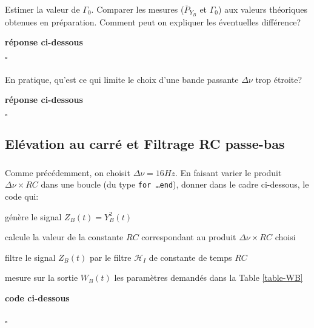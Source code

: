 \documentclass{article}
\newcommand{\dnu}{16}
\newcommand{\debutrep}[1]{\color{blue}\begin{center} \hrulefill \textbf{ #1 } \hrulefill \end{center} }
\newcommand{\finrep}{\vspace*{5mm}\hfill $\square$\color{black}\vspace*{5mm}}
\begin{document}
\subsubsection{}

Estimer la valeur de $\Gamma_0$. Comparer les mesures ($\overline{P}_{Y_B}$ et $\Gamma_0$) aux valeurs théoriques obtenues en préparation. Comment peut on expliquer les éventuelles différence?

\debutrep{réponse ci-dessous}

\finrep

\subsubsection{}
En pratique, qu'est ce qui limite le choix d'une  bande passante $\Delta \nu$ trop étroite?

\debutrep{réponse ci-dessous}

\finrep


\subsection{Elévation au carré et Filtrage RC passe-bas}

\subsubsection{}

Comme précédemment, on choisit $\Delta\nu = \dnu Hz$. En faisant varier le produit $\Delta \nu \times RC$ dans une boucle (du type {\tt for \ldots end}), donner dans le cadre ci-dessous, le code qui:

\begin{list}{-}{\setlength{\leftmargin}{3mm} \setlength{\labelwidth}{20mm} \setlength{\labelsep}{2mm} \setlength{\itemsep}{1mm} }
\item génère le signal $Z_B(t)= Y_B^2(t)$ 
\item calcule la valeur de la constante $RC$ correspondant au produit $\Delta\nu \times RC$ choisi
\item filtre le signal $Z_B(t)$ par le filtre $\mathcal{H}_{I}$ de constante de temps $RC$  
\item mesure sur la sortie $W_B(t)$ les paramètres demandés dans la  Table \ref{table-WB}
\end{list}

\debutrep{code ci-dessous}
\begin{verbatim}

\end{verbatim}
\finrep
\end{document}
